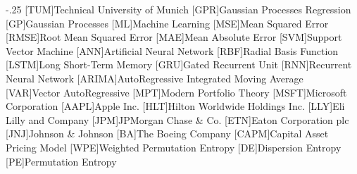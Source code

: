 \documentclass[headsepline,footsepline,footinclude=false,oneside,fontsize=11pt,paper=a4,listof=totoc,bibliography=totoc]{scrbook} %
\begin{document}


\frontmatter{}





\tableofcontents{}

\mainmatter{}










\appendix{}


\begin{acronym}
	\itemsep-.25\baselineskip
	[TUM]{Technical University of Munich}
	[GPR]{Gaussian Processes Regression}
	[GP]{Gaussian Processes}
	[ML]{Machine Learning}
	[MSE]{Mean Squared Error}
	[RMSE]{Root Mean Squared Error}
	[MAE]{Mean Absolute Error}
	[SVM]{Support Vector Machine}
	[ANN]{Artificial Neural Network}
	[RBF]{Radial Basis Function}
	[LSTM]{Long Short-Term Memory}
	[GRU]{Gated Recurrent Unit}
	[RNN]{Recurrent Neural Network}
	[ARIMA]{AutoRegressive Integrated Moving Average}
	[VAR]{Vector AutoRegressive}
	[MPT]{Modern Portfolio Theory}
	[MSFT]{Microsoft Corporation}
	[AAPL]{Apple Inc.}
	[HLT]{Hilton Worldwide Holdings Inc.}
	[LLY]{Eli Lilly and Company}
	[JPM]{JPMorgan Chase \& Co.}
	[ETN]{Eaton Corporation plc}
	[JNJ]{Johnson \& Johnson}
	[BA]{The Boeing Company}
	[CAPM]{Capital Asset Pricing Model}
	[WPE]{Weighted Permutation Entropy}
	[DE]{Dispersion Entropy}
	[PE]{Permutation Entropy}
\end{acronym}


\listoffigures{}
\listoftables{}
\printbibliography{}
\end{document}
